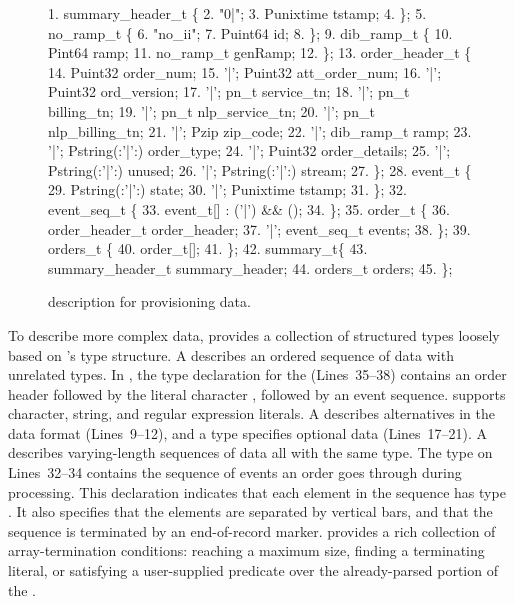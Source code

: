 \begin{figure}
\begin{scriptsize}
\begin{code}
{ 1}.   summary\_header\_t \{
{ 2}.  "0|";
{ 3}.  Punixtime tstamp;
{ 4}. \};
{ 5}.  no\_ramp\_t \{
{ 6}.  "no\_ii";
{ 7}.  Puint64 id;
{ 8}. \};
{ 9}.  dib\_ramp\_t \{
{10}.   Pint64     ramp;
{11}.   no\_ramp\_t  genRamp;
{12}. \};
{13}.  order\_header\_t \{
{14}.        Puint32             order\_num;
{15}.  '|';  Puint32             att\_order\_num;
{16}.  '|';  Puint32             ord\_version;
{17}.  '|';   pn\_t           service\_tn;
{18}.  '|';   pn\_t           billing\_tn;
{19}.  '|';   pn\_t           nlp\_service\_tn;
{20}.  '|';   pn\_t           nlp\_billing\_tn;
{21}.  '|';   Pzip           zip\_code;
{22}.  '|';  dib\_ramp\_t          ramp;
{23}.  '|';  Pstring(:'|':)      order\_type;
{24}.  '|';  Puint32             order\_details;
{25}.  '|';  Pstring(:'|':)      unused;
{26}.  '|';  Pstring(:'|':)      stream;
{27}. \};
{28}.  event\_t \{
{29}.        Pstring(:'|':)    state;   
{30}.   '|'; Punixtime         tstamp;
{31}. \};
{32}.  event\_seq\_t \{
{33}.   event\_t[] : ('|') && ();
{34}. \};
{35}.   order\_t \{
{36}.        order\_header\_t  order\_header;
{37}.   '|'; event\_seq\_t     events;
{38}. \};
{39}.  orders\_t \{
{40}.   order\_t[];
{41}. \};
{42}.   summary\_t\{
{43}.   summary\_header\_t  summary\_header;
{44}.   orders\_t          orders;
{45}. \};
\end{code}
\end{scriptsize}
\caption{\pads{} description for \dibbler{} provisioning data.}
\label{figure:dibbler}
\end{figure}


To describe more complex data, \pads{} provides a collection of
structured types loosely based on \C{}'s type structure.  A
 describes an ordered sequence of data with unrelated
types.  In , the type declaration for the
  (Lines~35--38) contains an order header
followed by the literal character , followed by an event
sequence. \pads{} supports character, string, and regular expression
literals.  A  describes alternatives in the data format
(Lines~9--12), and a  type specifies optional data
(Lines~17--21).  A  describes varying-length sequences of
data all with the same type.  The  type on Lines~32--34
contains the sequence of events an order goes through during
processing.  This declaration indicates that each element in the
sequence has type .  It also specifies that the elements
are separated by vertical bars, and that the sequence is terminated by
an end-of-record marker.  \pads{} provides a rich collection of
array-termination conditions: reaching a maximum size, finding a
terminating literal, or satisfying a user-supplied predicate over the
already-parsed portion of the .

